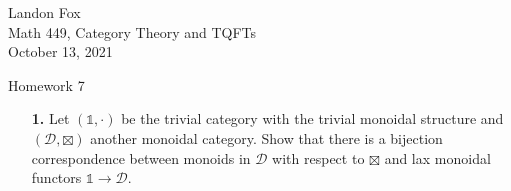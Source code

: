 \documentclass[ 12pt ]{article}
\begin{document}
\noindent Landon Fox \\
\noindent Math 449, Category Theory and TQFTs \\
\noindent October 13, 2021

\begin{center}
\Large Homework 7
\end{center}

\begin{enumerate}

	\item[\textbf{1.}] Let $(\mathbb{1}, \cdot)$ be the trivial category with the trivial monoidal structure and $(\mathscr{D}, \boxtimes)$ another monoidal category. Show that there is a bijection correspondence between monoids in $\mathscr{D}$ with respect to $\boxtimes$ and lax monoidal functors $\mathbb{1} \to \mathscr{D}$.


\end{enumerate}
\end{document}
